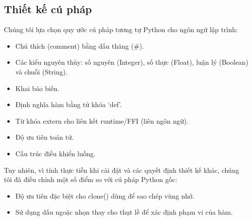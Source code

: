 \documentclass[a4paper]{article}
\begin{document}
	\subsection{Thiết kế cú pháp}
	
	Chúng tôi lựa chọn quy ước cú pháp tương tự Python cho ngôn ngữ lập trình:
	\begin{itemize}
		\item Chú thích (comment) bằng dấu thăng (\#).
		\item Các kiểu nguyên thủy: số nguyên (Integer), số thực (Float), luận lý (Boolean) và chuỗi (String).
		\item Khai báo biến.
		\item Định nghĩa hàm bằng từ khóa `def'.
		\item Từ khóa extern cho liên kết runtime/FFI (liên ngôn ngữ).
		\item Độ ưu tiên toán tử.
		\item Cấu trúc điều khiển luồng.
	\end{itemize}
	Tuy nhiên, vì tính thực tiễn khi cài đặt và các quyết định thiết kế khác, chúng tôi đã điều chỉnh một số điểm so với cú pháp Python gốc:
	\begin{itemize}
		\item Độ ưu tiên đặc biệt cho clone() dùng để sao chép vùng nhớ.
		\item Sử dụng dấu ngoặc nhọn thay cho thụt lề để xác định phạm vi của hàm.
	\end{itemize}
	
\end{document}
